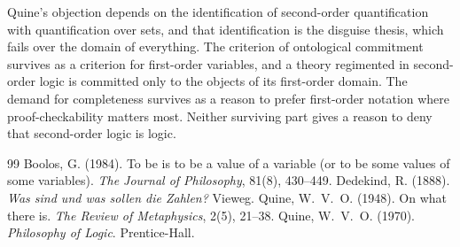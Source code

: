 \documentclass{situationist-preprint}
\begin{document}
Quine's objection depends on the identification of second-order quantification with quantification over sets, and that identification is the disguise thesis, which fails over the domain of everything. The criterion of ontological commitment survives as a criterion for first-order variables, and a theory regimented in second-order logic is committed only to the objects of its first-order domain. The demand for completeness survives as a reason to prefer first-order notation where proof-checkability matters most. Neither surviving part gives a reason to deny that second-order logic is logic.

\begin{thebibliography}{99}\small
{} Boolos, G. (1984). To be is to be a value of a variable (or to be some values of some variables). \emph{The Journal of Philosophy}, 81(8), 430--449.
 Dedekind, R. (1888). \emph{Was sind und was sollen die Zahlen?} Vieweg.
 Quine, W.~V.~O. (1948). On what there is. \emph{The Review of Metaphysics}, 2(5), 21--38.
 Quine, W.~V.~O. (1970). \emph{Philosophy of Logic}. Prentice-Hall.
\end{thebibliography}
\end{document}
